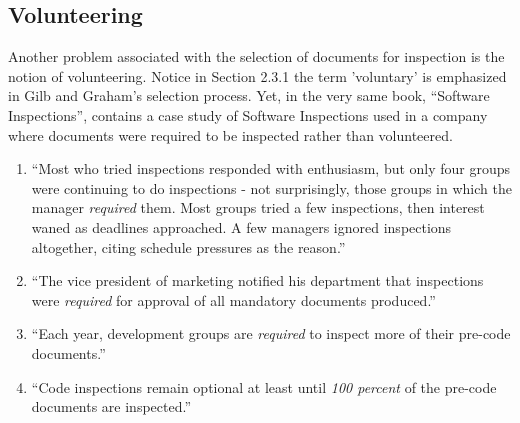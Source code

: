 \subsection{Volunteering}
Another problem associated with the selection of documents for inspection
is the notion of volunteering. Notice in Section 2.3.1 the term 'voluntary'
is emphasized in Gilb and Graham's selection process. Yet, in the very same
book, ``Software Inspections'', contains a case study of Software
Inspections used in a company where documents were required to be inspected
rather than volunteered.

\begin{enumerate}
\item ``Most who tried inspections responded with enthusiasm, but only four
  groups were continuing to do inspections - not surprisingly, those groups
  in which the manager \emph{required} them. Most groups tried a few
  inspections, then interest waned as deadlines approached. A few managers
  ignored inspections altogether, citing schedule pressures as the
  reason.''
\item ``The vice president of marketing notified his department that
  inspections were \emph{required} for approval of all mandatory documents
  produced.''
\item ``Each year, development groups are \emph{required} to inspect
  more of their pre-code documents.''
\item ``Code inspections remain optional at least until \emph{100 percent}
  of the pre-code documents are inspected.''
\end{enumerate}

















